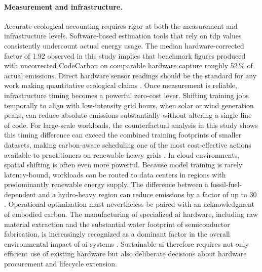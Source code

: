 \paragraph{Measurement and infrastructure.}
Accurate ecological accounting requires rigor at both the measurement and infrastructure levels. Software-based estimation tools that rely on \gls{tdp} values consistently undercount actual energy usage. The median hardware-corrected factor of 1.92 observed in this study implies that benchmark figures produced with uncorrected CodeCarbon on comparable hardware capture roughly 52\,\% of actual emissions. Direct hardware sensor readings should be the standard for any work making quantitative ecological claims \cite{rodriguezEvaluatingEnergyConsumption2024}. Once measurement is reliable, infrastructure timing becomes a powerful zero-cost lever. Shifting training jobs temporally to align with low-intensity grid hours, when solar or wind generation peaks, can reduce absolute emissions substantially without altering a single line of code.  For large-scale workloads, the counterfactual analysis in this study shows this timing difference can exceed the combined training footprints of smaller datasets, making carbon-aware scheduling one of the most cost-effective actions available to practitioners on renewable-heavy grids \cite{dodgeMeasuringCarbonIntensity2022}. In cloud environments, spatial shifting is often even more powerful. Because model training is rarely latency-bound, workloads can be routed to data centers in regions with predominantly renewable energy supply. The difference between a fossil-fuel-dependent and a hydro-heavy region can reduce emissions by a factor of up to 30 \cite{hendersonSystematicReportingEnergy2020}. Operational optimization must nevertheless be paired with an acknowledgment of embodied carbon. The manufacturing of specialized \gls{ai} hardware, including raw material extraction and the substantial water footprint of semiconductor fabrication, is increasingly recognized as a dominant factor in the overall environmental impact of \gls{ai} systems \cite{eilamMethodologyFrameworkAI2023,wuSustainableAIEnvironmental2022}. Sustainable \gls{ai} therefore requires not only efficient use of existing hardware but also deliberate decisions about hardware procurement and lifecycle extension.


